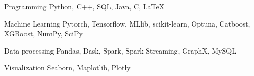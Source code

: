

\begin{cvskills}

  \cvskill
    {Programming} %
    {Python, C++, SQL, Java, C, LaTeX} %


  \cvskill
    {Machine Learning} %
    {Pytorch, Tensorflow, MLlib, scikit-learn, Optuna, Catboost, XGBoost, NumPy, SciPy} %

  \cvskill
    {Data processing} %
    {Pandas, Dask, Spark, Spark Streaming, GraphX, MySQL} %

  \cvskill
    {Visualization} %
    {Seaborn, Maplotlib, Plotly} %







\end{cvskills}

